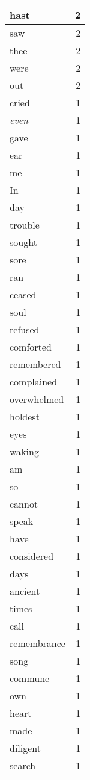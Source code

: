 \begin{center}
\begin{longtable}{l|r}
hast & 2\\ \hline 
saw & 2\\ \hline 
thee & 2\\ \hline 
were & 2\\ \hline 
out & 2\\ \hline 
cried & 1\\ \hline 
\emph{even} & 1\\ \hline 
gave & 1\\ \hline 
ear & 1\\ \hline 
me & 1\\ \hline 
In & 1\\ \hline 
day & 1\\ \hline 
trouble & 1\\ \hline 
sought & 1\\ \hline 
sore & 1\\ \hline 
ran & 1\\ \hline 
ceased & 1\\ \hline 
soul & 1\\ \hline 
refused & 1\\ \hline 
comforted & 1\\ \hline 
remembered & 1\\ \hline 
complained & 1\\ \hline 
overwhelmed & 1\\ \hline 
holdest & 1\\ \hline 
eyes & 1\\ \hline 
waking & 1\\ \hline 
am & 1\\ \hline 
so & 1\\ \hline 
cannot & 1\\ \hline 
speak & 1\\ \hline 
have & 1\\ \hline 
considered & 1\\ \hline 
days & 1\\ \hline 
ancient & 1\\ \hline 
times & 1\\ \hline 
call & 1\\ \hline 
remembrance & 1\\ \hline 
song & 1\\ \hline 
commune & 1\\ \hline 
own & 1\\ \hline 
heart & 1\\ \hline 
made & 1\\ \hline 
diligent & 1\\ \hline 
search & 1\\ \hline 

\end{longtable}
\end{center}
